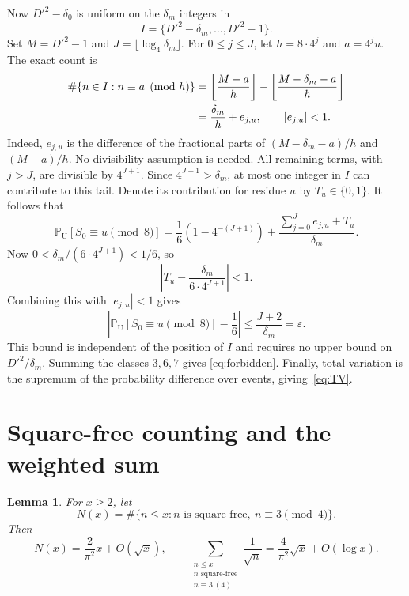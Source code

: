 \documentclass[a4paper,11pt]{article}
\newtheorem{lemma}{Lemma}
\theoremstyle{remark}
\newcommand{\PrU}{\mathbb P_{\mathrm U}}
\begin{document}
Now $D'^2-\delta_0$ is uniform on the $\delta_m$ integers in
\[
 I=\{D'^2-\delta_m,\ldots,D'^2-1\}.
\]
Set $M=D'^2-1$ and $J=\lfloor\log_4\delta_m\rfloor$.
For $0\le j\le J$, let $h=8\cdot4^j$ and $a=4^j u$.
The exact count is
\begin{align}
 \#\{n\in I:n\equiv a\pmod h\}
 &=\left\lfloor\frac{M-a}{h}\right\rfloor
   -\left\lfloor\frac{M-\delta_m-a}{h}\right\rfloor\notag\\
 &=\frac{\delta_m}{h}+e_{j,u},\qquad |e_{j,u}|<1.
 \label{eq:floor}
\end{align}
Indeed, $e_{j,u}$ is the difference of the fractional parts of
$(M-\delta_m-a)/h$ and $(M-a)/h$. No divisibility assumption is needed.
All remaining terms, with $j>J$, are divisible by $4^{J+1}$.
Since $4^{J+1}>\delta_m$, at most one integer in $I$ can contribute
to this tail. Denote its contribution for residue $u$ by $T_u\in\{0,1\}$.
It follows that
\[
 \PrU[S_0\equiv u\pmod8]
 =\frac16(1-4^{-(J+1)})
   +\frac{\sum_{j=0}^{J}e_{j,u}+T_u}{\delta_m}.
\]
Now $0<\delta_m/(6\cdot4^{J+1})<1/6$, so
\[
 \left|T_u-\frac{\delta_m}{6\cdot4^{J+1}}\right|<1.
\]
Combining this with $|e_{j,u}|<1$ gives
\[
 \left|\PrU[S_0\equiv u\pmod8]-\frac16\right|
 \le\frac{J+2}{\delta_m}=\varepsilon.
\]
This bound is independent of the position of $I$ and requires no upper
bound on $D'^2/\delta_m$. Summing the classes $3,6,7$ gives
\eqref{eq:forbidden}. Finally, total variation is the supremum of the
probability difference over events, giving~\eqref{eq:TV}.

\section{Square-free counting and the weighted sum}\label{app:counting}

\begin{lemma}\label{lem:count}
For $x\ge2$, let
\[
 N(x)=\#\{n\le x:n\text{ is square-free},\ n\equiv3\pmod4\}.
\]
Then
\begin{equation}\label{eq:count}
 N(x)=\frac2{\pi^2}x+O(\sqrt x),
 \qquad
 \sum_{\substack{n\le x\\n\text{ square-free}\\n\equiv3\ (4)}}
 \frac1{\sqrt n}
 =\frac4{\pi^2}\sqrt x+O(\log x).
\end{equation}
\end{lemma}
\end{document}
